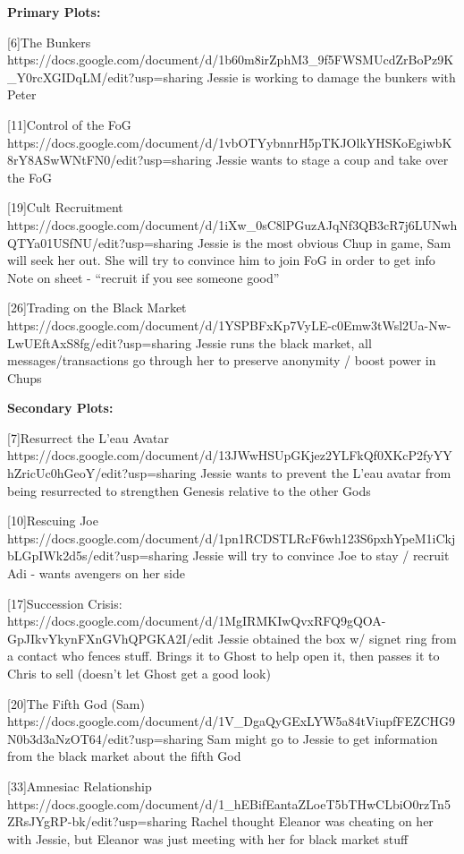 \documentclass[char]{GL2020}
\begin{document}
\textbf{Primary Plots:}

[6]The Bunkers https://docs.google.com/document/d/1b60m8irZphM3_9f5FWSMUcdZrBoPz9K_Y0rcXGIDqLM/edit?usp=sharing
Jessie is working to damage the bunkers with Peter

[11]Control of the FoG https://docs.google.com/document/d/1vbOTYybnnrH5pTKJOlkYHSKoEgiwbK8rY8ASwWNtFN0/edit?usp=sharing
Jessie wants to stage a coup and take over the FoG

[19]Cult Recruitment https://docs.google.com/document/d/1iXw_0sC8lPGuzAJqNf3QB3cR7j6LUNwhQTYa01USfNU/edit?usp=sharing
Jessie is the most obvious Chup in game, Sam will seek her out.  She will try to convince him to join FoG in order to get info
Note on sheet - "`recruit if you see someone good"'

[26]Trading on the Black Market https://docs.google.com/document/d/1YSPBFxKp7VyLE-c0Emw3tWsl2Ua-Nw-LwUEftAxS8fg/edit?usp=sharing
Jessie runs the black market, all messages/transactions go through her to preserve anonymity / boost power in Chups

\textbf{Secondary Plots:}

[7]Resurrect the L'eau Avatar https://docs.google.com/document/d/13JWwHSUpGKjez2YLFkQf0XKcP2fyYYhZricUc0hGeoY/edit?usp=sharing
Jessie wants to prevent the L'eau avatar from being resurrected to strengthen Genesis relative to the other Gods

[10]Rescuing Joe https://docs.google.com/document/d/1pn1RCDSTLRcF6wh123S6pxhYpeM1iCkjbLGpIWk2d5s/edit?usp=sharing
Jessie will try to convince Joe to stay / recruit Adi - wants avengers on her side

[17]Succession Crisis: https://docs.google.com/document/d/1MgIRMKIwQvxRFQ9gQOA-GpJIkvYkynFXnGVhQPGKA2I/edit
Jessie obtained the box w/ signet ring from a contact who fences stuff.  Brings it to Ghost to help open it, then passes it to Chris to sell (doesn't let Ghost get a good look)

[20]The Fifth God (Sam) https://docs.google.com/document/d/1V_DgaQyGExLYW5a84tViupfFEZCHG9N0b3d3aNzOT64/edit?usp=sharing
Sam might go to Jessie to get information from the black market about the fifth God

[33]Amnesiac Relationship https://docs.google.com/document/d/1_hEBifEantaZLoeT5bTHwCLbiO0rzTn5ZRsJYgRP-bk/edit?usp=sharing
Rachel thought Eleanor was cheating on her with Jessie, but Eleanor was just meeting with her for black market stuff
\end{document}
